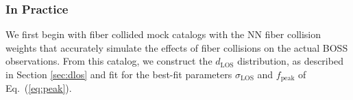                                                                                                                                                                                                                                                                          \subsubsection{In Practice}
                                                                                                                                                                                                                                                                         We first begin with fiber collided mock catalogs with the NN 
                                                                                                                                                                                                                                                                         fiber collision weights that accurately simulate the effects of 
                                                                                                                                                                                                                                                                         fiber collisions on the actual BOSS observations. From this catalog, we
                                                                                                                                                                                                                                                                         construct the $d_\mathrm{LOS}$ distribution, as described in Section 
                                                                                                                                                                                                                                                                         \ref{sec:dlos} and fit for the best-fit parameters $\sigma_\mathrm{LOS}$ 
                                                                                                                                                                                                                                                                         and $f_\mathrm{peak}$ of Eq.~(\ref{eq:peak}).

